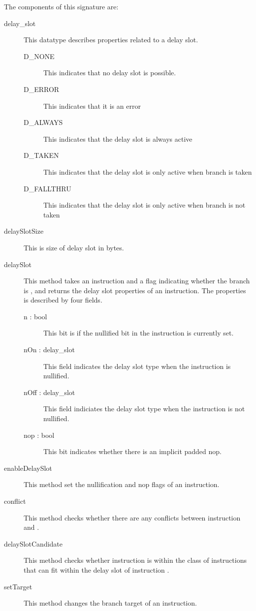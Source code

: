 The components of this signature are:
\begin{description}
  \item[delay\_slot] This datatype describes properties related to a 
      delay slot.
   \begin{description}
     \item[D\_NONE]   This indicates that no delay slot is possible.
     \item[D\_ERROR]  This indicates that it is an error 
     \item[D\_ALWAYS] This indicates that the delay slot is always active
     \item[D\_TAKEN]  This indicates that the 
              delay slot is only active when branch is taken
     \item[D\_FALLTHRU]  This indicates that the delay slot 
       is only active when branch is not taken 
   \end{description} 
  \item[delaySlotSize] This is size of delay slot in bytes.

  \item[delaySlot]  This method takes an instruction 
      and a flag indicating whether the branch is ,
     and returns the delay slot properties of an instruction.   The
      properties is described by four fields.
      \begin{description}
        \item[n : bool]  This bit is if the nullified bit in the
   instruction is currently set.
        \item[nOn : delay\_slot] This field indicates the delay slot 
          type when the instruction is nullified.
        \item[nOff : delay\_slot] This field indiciates the delay slot
         type when the instruction is not nullified. 
         \item[nop  : bool] This bit indicates whether there is an 
implicit padded nop.
      \end{description}


   \item[enableDelaySlot]
       This method set the nullification and nop flags of an instruction.

   \item[conflict] This method checks whether there are any conflicts
      between instruction  and .
   \item[delaySlotCandidate] 
       This method checks whether instruction  is within the
       class of instructions that can fit within the delay slot of 
       instruction .

   \item[setTarget]
       This method changes the branch target of an instruction.
\end{description}

